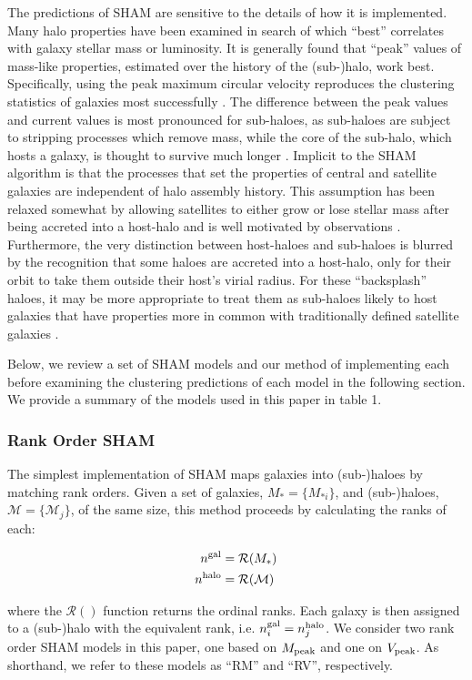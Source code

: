\documentclass[a4paper,fleqn,usenatbib]{mnras}
\begin{document}
The predictions of SHAM are sensitive to the details of how it is implemented.  Many halo properties have been examined in search of which ``best'' correlates with galaxy stellar mass or luminosity.  It is generally found that ``peak'' values of mass-like properties, estimated over the history of the (sub-)halo, work best.  Specifically, using the peak maximum circular velocity reproduces the clustering statistics of galaxies most successfully \citep{Conroy:2006iz, Reddick:2013gi}.  The difference between the peak values and current values is most pronounced for sub-haloes, as sub-haloes are subject to stripping processes which remove mass, while the core of the sub-halo, which hosts a galaxy, is thought to survive much longer \citep[e.g.][and references therein]{Behroozi:2014bg, vandenBosch:2016cj, Jiang:2016dw, vandenBosch:2016ky}.  Implicit to the SHAM algorithm is that the processes that set the properties of central and satellite galaxies are independent of halo assembly history.  This assumption has been relaxed somewhat by allowing satellites to either grow or lose stellar mass after being accreted into a host-halo \citep{Watson:2012hw, Yang:2012ew,  Behroozi:2015wx} and is well motivated by observations \citep{Wetzel:2013dw}.  Furthermore, the very distinction between host-haloes and sub-haloes is blurred by the recognition that some haloes are accreted into a host-halo, only for their orbit to take them outside their host's virial radius.  For these ``backsplash'' haloes, it may be more appropriate to treat them as sub-haloes likely to host galaxies that have properties more in common with traditionally defined satellite galaxies \citep{Mamon:2004jy, Wetzel:2014up}.

Below, we review a set of SHAM models and our method of implementing each before examining the clustering predictions of each model in the following section.  We provide a summary of the models used in this paper in table 1.


\subsubsection{Rank Order SHAM}
\label{sec:rank_sham}

The simplest implementation of SHAM maps galaxies into (sub-)haloes by matching rank orders.  Given a set of galaxies, $M_*=\{M_{*i}\}$, and (sub-)haloes, $\mathcal{M}=\{\mathcal{M}_j\}$, of the same size, this method proceeds by calculating the ranks of each:
%
\begin{linenomath}
\begin{align}
n^{\rm gal} &= \mathcal{R}(M_*) \nonumber \\
n^{\rm halo} &= \mathcal{R}(\mathcal{M})
\end{align}
\end{linenomath}
%
where the $\mathcal{R}()$ function returns the ordinal ranks.  Each galaxy is then assigned to a (sub-)halo with the equivalent rank, i.e. $n_i^{\rm gal}=n_j^{\rm halo}$.  We consider two rank order SHAM models in this paper, one based on $M_{\rm peak}$ and one on $V_{\rm peak}$.  As shorthand, we refer to these models as ``RM'' and ``RV'', respectively. 
\end{document}
